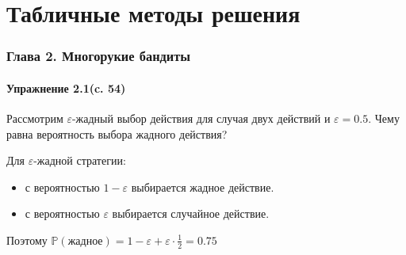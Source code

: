 \part{Табличные методы решения}
\section{Глава 2. Многорукие бандиты}
\subsection{Упражнение 2.1(c. 54)}
Рассмотрим $\varepsilon$-жадный выбор действия для случая двух действий и $\varepsilon = 0.5$. Чему равна вероятность выбора жадного действия? 
\begin{solution}
    Для $\varepsilon$-жадной стратегии:
    \begin{itemize}
        \item с вероятностью $1-\varepsilon$ выбирается жадное действие.
        \item с вероятностью $\varepsilon$ выбирается случайное действие.
    \end{itemize}
    Поэтому $\mathbb{P}(\text{жадное}) = 1-\varepsilon+\varepsilon \cdot \frac{1}{2}=0.75$
\end{solution}

